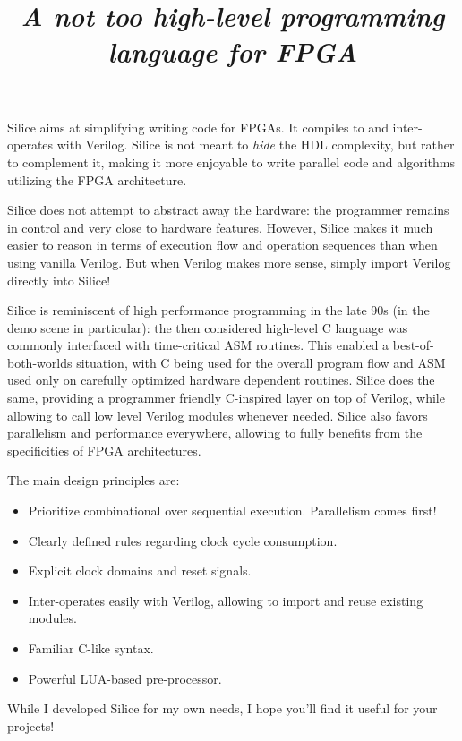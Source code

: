 \documentclass[a4]{article}
\title{\silice{}\\ \textit{\normalsize A not too high-level programming language for FPGA}}
\newcommand\verilog{Verilog}
\newcommand\silice{Silice}
\begin{document}
\maketitle

\silice{} aims at simplifying writing code for FPGAs. It compiles to and inter-operates with \verilog{}. \silice{} is not meant to \textit{hide} the HDL complexity, but rather to complement it, making it more enjoyable to write parallel code and algorithms utilizing the FPGA architecture.

\silice{} does not attempt to abstract away the hardware: the programmer remains in control and very close to hardware features. However, \silice{} makes it much easier to reason in terms of execution flow and operation sequences than when using vanilla \verilog{}. But when \verilog{} makes more sense, simply import Verilog directly into Silice!

\silice{} is reminiscent of high performance programming in the late 90s (in the demo scene in particular): the then considered high-level C language was commonly interfaced with time-critical ASM routines. This enabled a best-of-both-worlds situation, with C being used for the overall program flow and ASM used only on carefully optimized hardware dependent routines.
%
\silice{} does the same, providing a programmer friendly C-inspired layer on top of \verilog{}, while allowing to call low level \verilog{} modules whenever needed.
\silice{} also favors parallelism and performance everywhere, allowing to fully benefits from the specificities of FPGA architectures.

The main design principles are:
\begin{itemize}
\item Prioritize combinational over sequential execution. Parallelism comes first!
\item Clearly defined rules regarding clock cycle consumption.
\item Explicit clock domains and reset signals.
\item Inter-operates easily with \verilog{}, allowing to import and reuse existing modules.
\item Familiar C-like syntax.
\item Powerful LUA-based pre-processor.
\end{itemize}

\noindent While I developed \silice{} for my own needs, I hope you'll find it useful for your projects!

	
\end{document}
